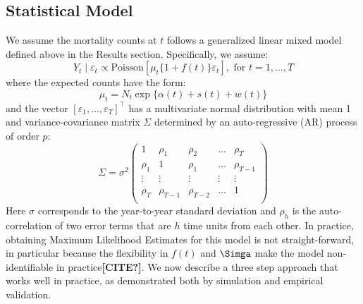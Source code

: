 \documentclass[11pt]{article}
\begin{document}
\subsection{Statistical Model}
\label{subsec:statistical-model}
We assume the mortality counts at $t$ follows a generalized linear mixed model defined above in the Results section. Specifically, we assume:
\begin{equation*}
    Y_t \mid \varepsilon_t \propto \mbox{Poisson}[ \mu_t \{1 + f(t)\}  \varepsilon_t ], \mbox{ for } t = 1, \dots,T 
\end{equation*}
where the expected counts have the form:
\begin{equation*}
    \mu_t =N_t  \exp\{ \alpha(t) + s(t) + w(t) \}
\end{equation*}
and the vector $[\varepsilon_1, \ldots, \varepsilon_T]^\top$ has a multivariate normal distribution with mean 1 and variance-covariance matrix $\Sigma$ determined by an auto-regressive (AR) process of order $p$:
\begin{equation*}
    \Sigma = \sigma^2
    \begin{pmatrix} 1 & \rho_1 & \rho_{2} & \dots & \rho_{T} \\ 
    \rho_{1} & 1 & \rho_{1} & \ldots & \rho_{T-1} \\
    \vdots & \vdots & \vdots & \vdots & \vdots \\
    \rho_{T} & \rho_{T-1} & \rho_{T-2} & \dots & 1 \\ 
    \end{pmatrix}
\end{equation*}
Here $\sigma$ corresponds to the year-to-year standard deviation and $\rho_h$ is the auto-correlation of two error terms that are $h$ time units from each other. In practice, obtaining Maximum Likelihood Estimates for this model is not straight-forward, in particular because the flexibility in $f(t)$ and $\Simga$ make the model non-identifiable in practice\textbf{[CITE?]}. We now describe a three step approach that works well in practice, as demonstrated both by simulation and empirical validation. \\
\end{document}
